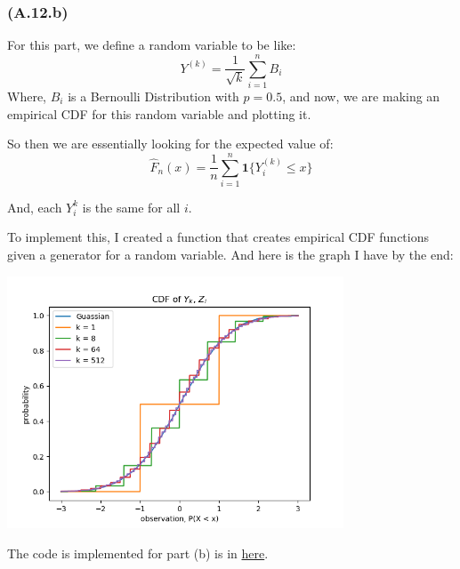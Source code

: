 \documentclass[]{article}
\begin{document}
        \subsubsection*{(A.12.b)}
            For this part, we define a random variable to be like: 
            $$
                Y^{(k)} = \frac{1}{\sqrt{k}}\sum_{i = 1}^{n}
                    B_i
            $$
            Where, $B_i$ is a Bernoulli Distribution with $p = 0.5$, and now, we are making an empirical CDF for this random variable and plotting it. 
            \par
            So then we are essentially looking for the expected value of: 
            $$
                \hat{F}_n(x) = 
                \frac{1}{n}
                    \sum_{i = 1}^{n}
                        \mathbf{1}\{Y^{(k)}_i \le x\}
            $$

            And, each $Y_i^{k}$ is the same for all $i$. 
            \par
            To implement this, I created a function that creates empirical CDF functions given a generator for a random variable. 
            And here is the graph I have by the end: 
            \begin{center}
                \includegraphics[width=10cm]{CDF.png}    
            \end{center}
            The code is implemented for part (b) is in \hyperref[lst:code]{here}. 
\end{document}
